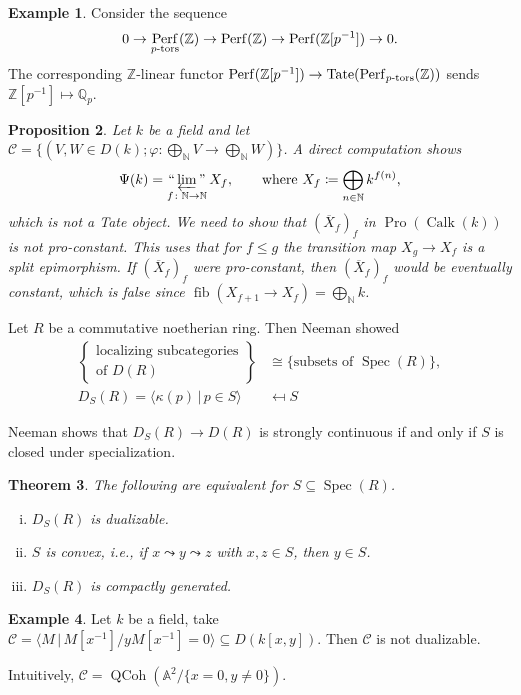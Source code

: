 \documentclass[draft]{amsart}
\newcommand{\NN}{\mathbb{N}}
\newcommand{\ZZ}{\mathbb{Z}}
\newcommand{\QQ}{\mathbb{Q}}
\renewcommand{\AA}{\mathbb{A}}
\newcommand{\ol}[1]{\overline{#1}}
\newcommand{\cat}[1]{\mathcal{#1}}
\DeclareMathOperator{\Spec}{Spec}
\DeclareMathOperator{\fib}{fib}
\DeclareMathOperator{\Perf}{Perf}
\DeclareMathOperator{\Pro}{Pro}
\DeclareMathOperator{\Tate}{Tate}
\DeclareMathOperator{\Calk}{Calk}
\DeclareMathOperator{\QCoh}{QCoh}
\DeclareMathOperator*{\indprojlim}{\text{``}\varprojlim\text{''}} %
\newtheorem{thm}{Theorem}[section]
\newtheorem{prop}[thm]{Proposition}
\theoremstyle{definition}
\newtheorem{ex}[thm]{Example}
\begin{document}
\begin{ex}
Consider the sequence 
\[
0\to \Perf_{\textnormal{$p$-tors}}(\ZZ) \to \Perf(\ZZ) \to \Perf(\ZZ[p^{-1}]) \to 0.
\]
The corresponding $\ZZ$-linear functor $\Perf(\ZZ[p^{-1}]) \to \Tate(\Perf_{\textnormal{$p$-tors}}(\ZZ))$ sends $\ZZ[p^{-1}] \mapsto \QQ_p$.
\end{ex}

\begin{prop}
Let $k$ be a field and let $\cat C = \{(V,W\in D(k); \varphi\colon \bigoplus_{\NN} V \to \bigoplus_{\NN} W)\}$. A direct computation shows
\[
\Psi(k) = \indprojlim_{f\colon \NN\to \NN} X_f,\qquad \text{where $X_f \coloneqq \bigoplus_{n\in\NN} k^{f(n)}$,}
\]
which is not a Tate object. We need to show that $(\ol X_f)_f$ in $\Pro(\Calk(k))$ is not pro-constant. This uses that for $f\le g$ the transition map $X_g\to X_f$ is a split epimorphism. If $(\ol X_f)_f$ were pro-constant, then $(\ol X_f)_f$ would be eventually constant, which is false since $\fib(X_{f+1}\to X_f) = \bigoplus_{\NN}k$.
\end{prop}

Let $R$ be a commutative noetherian ring. Then Neeman showed
\begin{align*}
\begin{Bmatrix}
\text{localizing subcategories} \\
\text{of $D(R)$}
\end{Bmatrix} &\cong \{\text{subsets of $\Spec(R)$}\}, \\
D_S(R) = \langle \kappa(p)\,|\, p\in S\rangle &\mapsfrom S
\end{align*}

Neeman shows that $D_S(R) \to D(R)$ is strongly continuous if and only if $S$ is closed under specialization.

\begin{thm}
The following are equivalent for $S\subseteq \Spec(R)$.
\begin{enumerate}[(i)]
\item $D_S(R)$ is dualizable.
\item $S$ is convex, i.e., if $x\leadsto y\leadsto z$ with $x,z\in S$, then $y\in S$.
\item $D_S(R)$ is compactly generated.
\end{enumerate}
\end{thm}

\begin{ex}
Let $k$ be a field, take $\cat C = \langle M\,|\, M[x^{-1}]/y M[x^{-1}] = 0\rangle \subseteq D(k[x,y])$. Then $\cat C$ is not dualizable. 

Intuitively, $\cat C = \QCoh(\AA^2/\{x=0, y\neq 0\})$.
\end{ex}
\end{document}
